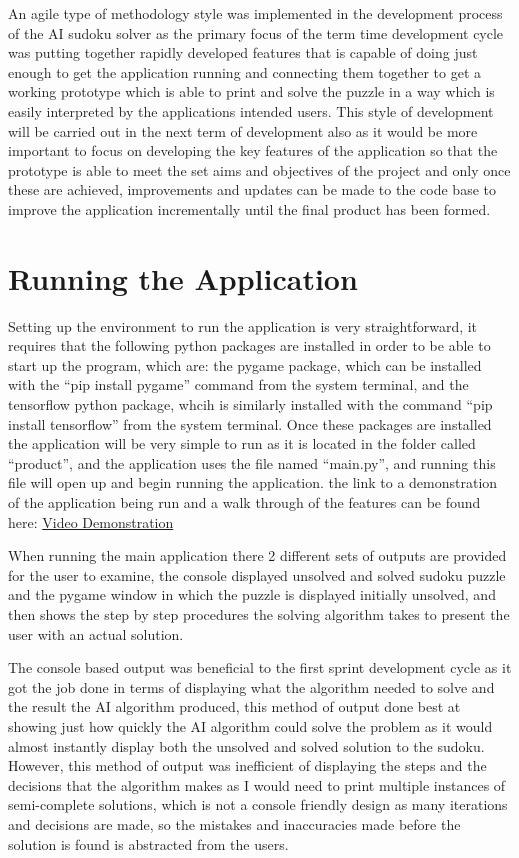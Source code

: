 \documentclass[]{final_report}
\begin{document}
An agile type of methodology style was implemented in the development process of the AI sudoku solver as the primary focus of the term time development cycle was putting together rapidly developed features that is capable of doing just enough to get the application running and connecting them together to get a working prototype which is able to print and solve the puzzle in a way which is easily interpreted by the applications intended users. This style of development will be carried out in the next term of development also as it would be more important to focus on developing the key features of the application so that the prototype is able to meet the set aims and objectives of the project and only once these are achieved, improvements and updates can be made to the code base to improve the application incrementally until the final product has been formed. 

\section{Running the Application}

Setting up the environment to run the application is very straightforward, it requires that the following python packages are installed in order to be able to start up the program, which are: the pygame package, which can be installed with the “pip install pygame” command from the system terminal, and the tensorflow python package, whcih is similarly installed with the command “pip install tensorflow” from the system terminal. Once these packages are installed the application will be very simple to run as it is located in the folder called “product”, and the application uses the file named “main.py”, and running this file will open up and begin running the application. the link to a demonstration of the application being run and a walk through of the features can be found here: \href{https://}{Video Demonstration}

When running the main application there 2 different sets of outputs are provided for the user to examine, the console displayed unsolved and solved sudoku puzzle and the pygame window in which the puzzle is displayed initially unsolved, and then shows the step by step procedures the solving algorithm takes to present the user with an actual solution. 

The console based output was beneficial to the first sprint development cycle as it got the job done in terms of displaying what the algorithm needed to solve and the result the AI algorithm produced, this method of output done best at showing just how quickly the AI algorithm could solve the problem as it would almost instantly display both the unsolved and solved solution to the sudoku. However, this method of output was inefficient of displaying the steps and the decisions that the algorithm makes as I would need to print multiple instances of semi-complete solutions, which is not a console friendly design as many iterations and decisions are made, so the mistakes and inaccuracies made before the solution is found is abstracted from the users. 
\end{document}
